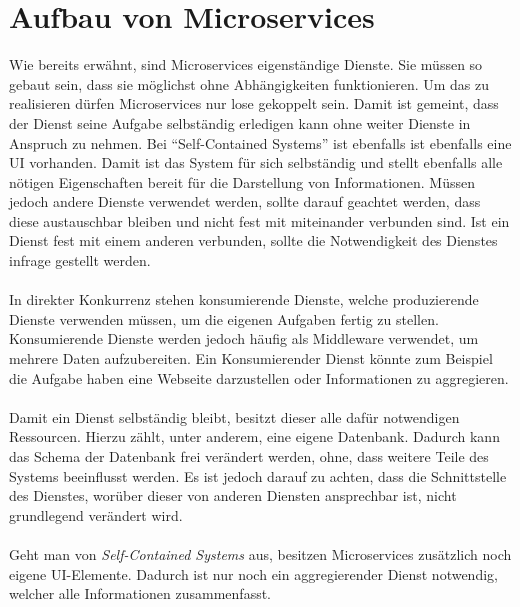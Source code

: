 \section{Aufbau von Microservices}
\label{sec:Aufbau}
Wie bereits erwähnt, sind Microservices eigenständige Dienste. Sie müssen so gebaut sein, dass sie möglichst ohne Abhängigkeiten funktionieren. Um das zu realisieren dürfen Microservices nur lose gekoppelt sein. Damit ist gemeint, dass der Dienst seine Aufgabe selbständig erledigen kann ohne weiter Dienste in Anspruch zu nehmen. Bei "`Self-Contained Systems"' ist ebenfalls ist ebenfalls eine UI vorhanden. Damit ist das System für sich selbständig und stellt ebenfalls alle nötigen Eigenschaften bereit für die Darstellung von Informationen. Müssen jedoch andere Dienste verwendet werden, sollte darauf geachtet werden, dass diese austauschbar bleiben und nicht fest mit miteinander verbunden sind. Ist ein Dienst fest mit einem anderen verbunden, sollte die Notwendigkeit des Dienstes infrage gestellt werden.
\\\\
In direkter Konkurrenz stehen konsumierende Dienste, welche produzierende Dienste verwenden müssen, um die eigenen Aufgaben fertig zu stellen. Konsumierende Dienste werden jedoch häufig als Middleware verwendet, um mehrere Daten aufzubereiten. Ein Konsumierender Dienst könnte zum Beispiel die Aufgabe haben eine Webseite darzustellen oder Informationen zu aggregieren.
\\\\
Damit ein Dienst selbständig bleibt, besitzt dieser alle dafür notwendigen Ressourcen. Hierzu zählt, unter anderem, eine eigene Datenbank. Dadurch kann das Schema der Datenbank frei verändert werden, ohne, dass weitere Teile des Systems beeinflusst werden. Es ist jedoch darauf zu achten, dass die Schnittstelle des Dienstes, worüber dieser von anderen Diensten ansprechbar ist, nicht grundlegend verändert wird.
\\\\
Geht man von \textit{Self-Contained Systems} aus, besitzen Microservices zusätzlich noch eigene UI-Elemente. Dadurch ist nur noch ein aggregierender Dienst notwendig, welcher alle Informationen zusammenfasst.

